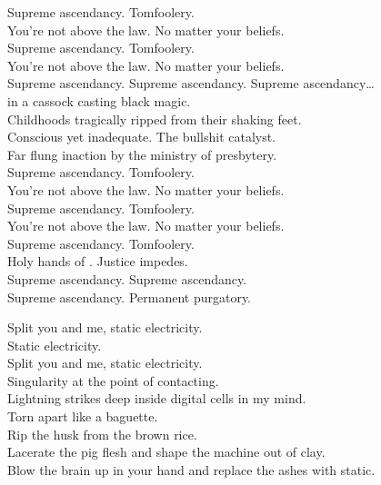 Supreme ascendancy. Tomfoolery. \\
You're not above the law. No matter your beliefs. \\
Supreme ascendancy. Tomfoolery. \\
You're not above the law. No matter your beliefs. \\

Supreme ascendancy. Supreme ascendancy. Supreme ascendancy… \\

 in a cassock casting black magic. \\
Childhoods tragically ripped from their shaking feet. \\
Conscious yet inadequate. The bullshit catalyst. \\
Far flung inaction by the ministry of presbytery. \\

Supreme ascendancy. Tomfoolery. \\
You're not above the law. No matter your beliefs. \\
Supreme ascendancy. Tomfoolery. \\
You're not above the law. No matter your beliefs. \\
Supreme ascendancy. Tomfoolery. \\
Holy hands of . Justice impedes. \\

Supreme ascendancy. Supreme ascendancy. \\
Supreme ascendancy. Permanent purgatory. \\




Split you and me, static electricity. \\
Static electricity. \\
Split you and me, static electricity. \\

Singularity at the point of contacting. \\
Lightning strikes deep inside digital cells in my mind. \\
Torn apart like a baguette. \\
Rip the husk from the brown rice. \\
Lacerate the pig flesh and shape the machine out of clay. \\
Blow the brain up in your hand and replace the ashes with static. \\

